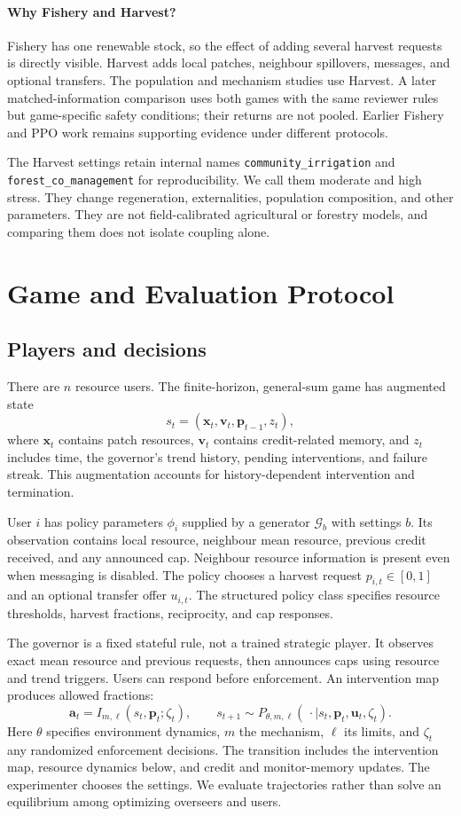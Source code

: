 \documentclass[10pt]{article}
\begin{document}
\paragraph{Why Fishery and Harvest?}
Fishery has one renewable stock, so the effect of adding several harvest requests is directly visible. Harvest adds local patches, neighbour spillovers, messages, and optional transfers. The population and mechanism studies use Harvest. A later matched-information comparison uses both games with the same reviewer rules but game-specific safety conditions; their returns are not pooled. Earlier Fishery and PPO work remains supporting evidence under different protocols.

The Harvest settings retain internal names \texttt{community\_irrigation} and \texttt{forest\_co\_management} for reproducibility. We call them moderate and high stress. They change regeneration, externalities, population composition, and other parameters. They are not field-calibrated agricultural or forestry models, and comparing them does not isolate coupling alone.

\section{Game and Evaluation Protocol}
\subsection{Players and decisions}
There are $n$ resource users. The finite-horizon, general-sum game has augmented state
\[
s_t=(\mathbf x_t,\mathbf v_t,\mathbf p_{t-1},z_t),
\]
where $\mathbf x_t$ contains patch resources, $\mathbf v_t$ contains credit-related memory, and $z_t$ includes time, the governor's trend history, pending interventions, and failure streak. This augmentation accounts for history-dependent intervention and termination.

User $i$ has policy parameters $\phi_i$ supplied by a generator $\mathcal G_b$ with settings $b$. Its observation contains local resource, neighbour mean resource, previous credit received, and any announced cap. Neighbour resource information is present even when messaging is disabled. The policy chooses a harvest request $p_{i,t}\in[0,1]$ and an optional transfer offer $u_{i,t}$. The structured policy class specifies resource thresholds, harvest fractions, reciprocity, and cap responses.

The governor is a fixed stateful rule, not a trained strategic player. It observes exact mean resource and previous requests, then announces caps using resource and trend triggers. Users can respond before enforcement. An intervention map produces allowed fractions:
\[
\mathbf a_t=I_{m,\ell}(s_t,\mathbf p_t;\zeta_t),\qquad
s_{t+1}\sim P_{\theta,m,\ell}(\,\cdot\mid s_t,\mathbf p_t,\mathbf u_t,\zeta_t).
\]
Here $\theta$ specifies environment dynamics, $m$ the mechanism, $\ell$ its limits, and $\zeta_t$ any randomized enforcement decisions. The transition includes the intervention map, resource dynamics below, and credit and monitor-memory updates. The experimenter chooses the settings. We evaluate trajectories rather than solve an equilibrium among optimizing overseers and users.
\end{document}
